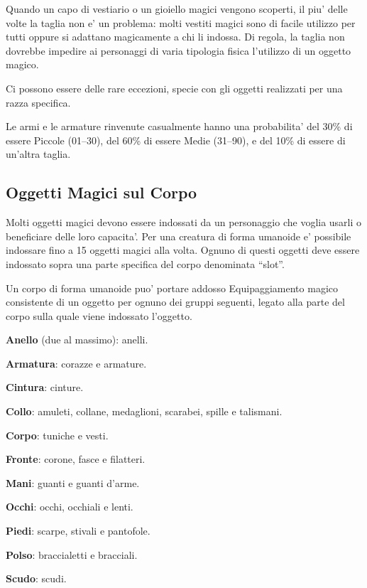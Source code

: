 \documentclass[a4paper,11pt,twoside,openany]{dndbook}
\begin{document}
{\label{taglia-e-oggetti-magici}

Quando un capo di vestiario o un gioiello magici vengono scoperti, il piu' delle volte la taglia non e' un problema: molti vestiti magici sono di facile utilizzo per tutti oppure si adattano magicamente a chi li indossa. Di regola, la taglia non dovrebbe impedire ai personaggi di varia tipologia fisica l'utilizzo di un oggetto magico. 

Ci possono essere delle rare eccezioni, specie con gli oggetti realizzati per una razza specifica.

Le armi e le armature rinvenute casualmente hanno una probabilita' del 30\% di essere Piccole (01--30), del 60\% di essere Medie (31--90), e del 10\% di essere di un'altra taglia.

\subsection{Oggetti Magici sul Corpo}

\label{oggetti-magici-sul-corpo}

Molti oggetti magici devono essere indossati da un personaggio che voglia usarli o beneficiare delle loro capacita'. Per una creatura di forma umanoide e' possibile indossare fino a 15 oggetti magici alla volta. Ognuno di questi oggetti deve essere indossato sopra una parte specifica del corpo denominata ``slot''.

Un corpo di forma umanoide puo' portare addosso Equipaggiamento magico consistente di un oggetto per ognuno dei gruppi seguenti, legato alla parte del corpo sulla quale viene indossato l'oggetto.

\textbf{Anello} (due al massimo): anelli.

\textbf{Armatura}: corazze e armature.

\textbf{Cintura}: cinture.

\textbf{Collo}: amuleti, collane, medaglioni, scarabei, spille e talismani.

\textbf{Corpo}: tuniche e vesti.

\textbf{Fronte}: corone, fasce e filatteri.

\textbf{Mani}: guanti e guanti d'arme.

\textbf{Occhi}: occhi, occhiali e lenti.

\textbf{Piedi}: scarpe, stivali e pantofole.

\textbf{Polso}: braccialetti e bracciali.

\textbf{Scudo}: scudi.

}
\end{document}
